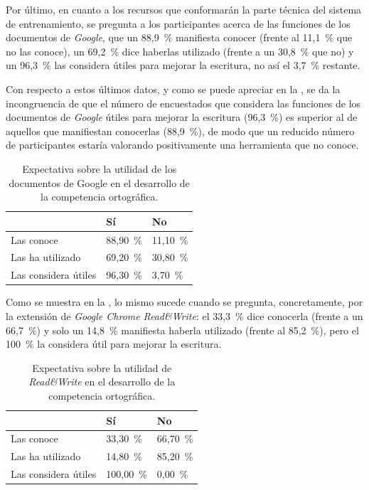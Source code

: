 \documentclass[spanish]{textolivre}
\begin{document}
Por último, en cuanto a los recursos que conformarán la parte técnica del sistema de entrenamiento, se pregunta a los participantes acerca de las funciones de los documentos de \textit{Google}, que un 88,9~\% manifiesta conocer (frente al 11,1~\% que no las conoce), un 69,2~\% dice haberlas utilizado (frente a un 30,8~\% que no) y un 96,3~\% las considera útiles para mejorar la escritura, no así el 3,7~\% restante.

Con respecto a estos últimos datos, y como se puede apreciar en la , se da la incongruencia de que el número de encuestados que considera las funciones de los documentos de \textit{Google} útiles para mejorar la escritura (96,3~\%) es superior al de aquellos que manifiestan conocerlas (88,9~\%), de modo que un reducido número de participantes estaría valorando positivamente una herramienta que no conoce.

\begin{table}[htbp]
\centering
\begin{threeparttable}
\caption{Expectativa sobre la utilidad de los documentos de Google en el desarrollo de la competencia ortográfica.}
\label{tb4}
\begin{tabular}{lll}
\toprule
& Sí & No \\ 
\midrule
Las conoce & 88,90~\% & 11,10~\% \\
Las ha utilizado & 69,20~\% & 30,80~\% \\
Las considera útiles & 96,30~\% & 3,70~\% \\
\bottomrule
\end{tabular}
\end{threeparttable}
\end{table}

Como se muestra en la , lo mismo sucede cuando se pregunta, concretamente, por la extensión de \textit{Google Chrome} \textit{Read\&Write}: el 33,3~\% dice conocerla (frente a un 66,7~\%) y solo un 14,8~\% manifiesta haberla utilizado (frente al 85,2~\%), pero el 100~\% la considera útil para mejorar la escritura.

\begin{table}[htbp]
\centering
\begin{threeparttable}
\caption{Expectativa sobre la utilidad de \textit{Read\&Write} en el desarrollo de la competencia ortográfica.}
\label{tb5}
\begin{tabular}{lll}
\toprule
& Sí & No \\ 
\midrule
Las conoce & 33,30~\% & 66,70~\% \\
Las ha utilizado & 14,80~\% & 85,20~\% \\
Las considera útiles & 100,00~\% & 0,00~\% \\
\bottomrule
\end{tabular}
\end{threeparttable}
\end{table}
\end{document}
